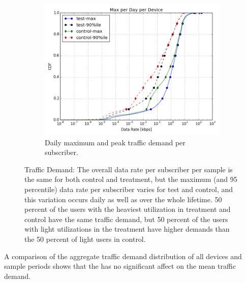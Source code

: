 \begin{figure}[t]
\begin{minipage}{1\linewidth}
%
\begin{subfigure}[b]{0.33\linewidth}
\includegraphics[width=\linewidth]{figures/cdf-max-per-day-per-device.png}
               \caption{Daily maximum and peak 
traffic demand per subscriber.\label{fig:CDF-data-rate-max-daily}}
\end{subfigure}
%
\end{minipage}
\caption{Traffic Demand: The overall data rate per subscriber per sample is the 
same for both control and treatment, but the maximum (and 95 percentile) data 
rate per subscriber varies for test and control, and this variation occurs 
daily as well as over the whole lifetime. 50 percent of the users with the 
heaviest utilization in treatment and control have the same traffic demand, 
but 50 percent of the users with light utilizations in the treatment have 
higher demands than the 50 percent of light users in control.}
\label{fig:traffic-demand}
\end{figure}


A comparison of the aggregate traffic demand distribution of all devices 
and sample periods shows that the \treatment{} has no significant affect on the 
mean traffic demand. 
